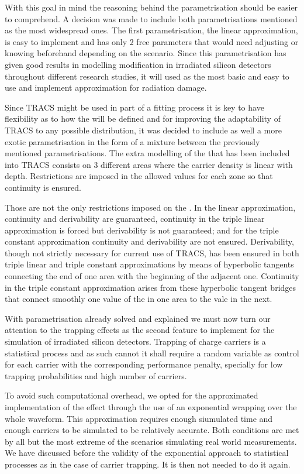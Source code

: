 With this goal in mind the reasoning behind the parametrisation should be easier to comprehend. A decision was made to include both \neff parametrisations mentioned as the most widespread ones. The first parametrisation, the linear approximation, is easy to implement and has only 2 free parameters that would need adjusting or knowing beforehand depending on the scenario. Since this parametrisation has given good results in modelling \neff modification in irradiated silicon detectors throughout different research studies, it will used as the most basic and easy to use and implement approximation for radiation damage.

Since TRACS might be used in part of a fitting process it is key to have flexibility as to how the \neff will be defined and for improving the adaptability of TRACS to any possible \neff distribution, it was decided to include as well a more exotic \neff parametrisation in the form of a mixture between the previously mentioned parametrisations. The extra modelling of the \neff that has been included into TRACS consists on 3 different areas where the carrier density is linear with depth. Restrictions are imposed in the allowed values for each zone so that continuity is ensured. 

Those are not the only restrictions imposed on the \neff. In the linear approximation, continuity and derivability are guaranteed, continuity in the triple linear approximation is forced but derivability is not guaranteed; and for the triple constant approximation continuity and derivability are not ensured. Derivability, though not strictly necessary for current use of TRACS, has been ensured in both triple linear and triple constant approximations by means of hyperbolic tangents connecting the end of one area with the beginning of the adjacent one. Continuity in the triple constant approximation arises from these hyperbolic tangent bridges that connect smoothly one value of the \neff in one area to the vale in the next. 


With \neff parametrisation already solved and explained we must now turn our attention to the trapping effects as the second feature to implement for the simulation of irradiated silicon detectors. Trapping of charge carriers is a statistical process and as such cannot it shall require a random variable as control for each carrier with the corresponding performance penalty, specially for low trapping probabilities and high number of carriers.

To avoid such computational overhead, we opted for the approximated implementation of the effect through the use of an exponential wrapping over the whole waveform. This approximation requires enough siumulated time and enough carriers to be simulated to be relatively accurate. Both conditions are met by all but the most extreme of the scenarios simulating real world measurements. We have discussed before the validity of the exponential approach to statistical processes as in the case of carrier trapping. It is then not needed to do it again.

